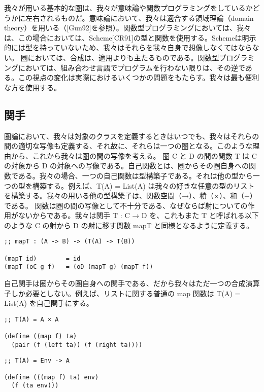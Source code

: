 \documentclass[11pt, oneside]{jsbook}   	%
\begin{document}
我々が用いる基本的な圏は、我々が意味論や関数プログラミングをしているかどうかに左右されるものだ。意味論において、我々は適合する領域理論（domain theory）を用いる（[Gun92]を参照）。関数型プログラミングにおいては、我々は、この場合においては、Scheme[CR91]の型と関数を使用する。Schemeは明示的には型を持っていないため、我々はそれらを我々自身で想像しなくてはならない。
圏においては、合成は、適用よりも主たるものである。関数型プログラミングにおいては、組み合わせ言語でプログラムを行わない限りは、その逆である。この視点の変化は実際におけるいくつかの問題をもたらす。我々は最も便利な方を使用する。
\subsection{ 関手 }
圏論において、我々は対象のクラスを定義するときはいつでも、我々はそれらの間の適切な写像も定義する、それ故に、それらは一つの圏となる。このような理由から、これから我々は圏の間の写像を考える。
圏 C と D の間の関数 T は C の対象から D の対象への写像である。自己関数とは、圏からその圏自身への関数である。我々の場合、一つの自己関数は型構築子である。それは他の型から一つの型を構築する。例えば、T(A) = List(A) は我々の好きな任意の型のリストを構築する。我々の用いる他の型構築子は、関数空間（→）、積（×）、和（+）である。
関数は圏の間の写像として不十分である、なぜならば射についての作用がないからである。我々は関手 T : C → D を、これもまた T と呼ばれる以下のような C の射から D の射に移す関数 mapT と同様となるように定義する。
\begin{lstlisting}
;; mapT : (A -> B) -> (T(A) -> T(B))

(mapT id)        = id
(mapT (oC g f)   = (oD (mapT g) (mapT f))
\end{lstlisting}
自己関手は圏からその圏自身への関手である、だから我々はただ一つの合成演算子しか必要としない。例えば、リストに関する普通の map 関数は T(A) = List(A) を自己関手にする。

\begin{lstlisting}
;; T(A) = A × A

(define ((map f) ta)
  (pair (f (left ta)) (f (right ta))))
\end{lstlisting}

\begin{lstlisting}
;; T(A) = Env -> A

(define (((map f) ta) env)
  (f (ta env)))
\end{lstlisting}
\end{document}
